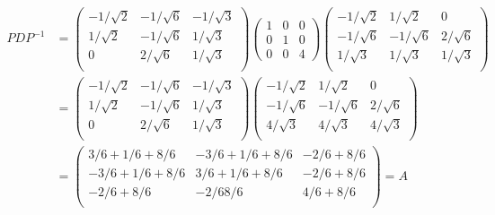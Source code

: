 \documentclass[letter]{memoir} %
\begin{document}
\begin{enumerate}
\[
\begin{split}
 PDP^{-1} &  =  \begin{pmatrix}
	-1/\sqrt{2} & -1/\sqrt{6} & -1/\sqrt{3} \\
	1/\sqrt{2} & -1/\sqrt{6} & 1/\sqrt{3} \\
	0 & 2/\sqrt{6} & 1/\sqrt{3} \\
    \end{pmatrix} 
 \begin{pmatrix}
	1 & 0 & 0 \\
   0 & 1  & 0 \\
    0 &0 & 4
    \end{pmatrix}     
    \begin{pmatrix}
	-1/\sqrt{2} & 1/\sqrt{2} & 0 \\
	-1/\sqrt{6} & -1/\sqrt{6} & 2/\sqrt{6} \\
	1/\sqrt{3} & 1/\sqrt{3} & 1/\sqrt{3} \\
    \end{pmatrix}     \\
    &  =  \begin{pmatrix}
	-1/\sqrt{2} & -1/\sqrt{6} & -1/\sqrt{3} \\
	1/\sqrt{2} & -1/\sqrt{6} & 1/\sqrt{3} \\
	0 & 2/\sqrt{6} & 1/\sqrt{3} \\
    \end{pmatrix} 
     \begin{pmatrix}
	-1/\sqrt{2} & 1/\sqrt{2} & 0 \\
	-1/\sqrt{6} & -1/\sqrt{6} & 2/\sqrt{6} \\
	4/\sqrt{3} & 4/\sqrt{3} & 4/\sqrt{3} \\
    \end{pmatrix}     \\
    & =  \begin{pmatrix}
	3/6+1/6+8/6 & -3/6+1/6+8/6 & -2/6+8/6 \\
	-3/6+1/6+8/6 & 3/6+1/6+8/6 & -2/6+8/6 \\
	-2/6+8/6 & -2/68/6 & 4/6+8/6 \\
    \end{pmatrix}     =A
\end{split}
\]


\end{enumerate}
\end{document}
